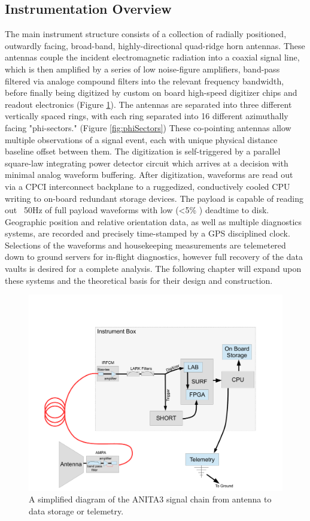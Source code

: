 	
	\subsection{Instrumentation Overview}
	The main instrument structure consists of a collection of radially positioned, outwardly facing, broad-band, highly-directional quad-ridge horn antennas.  These antennas couple the incident electromagnetic radiation into a coaxial signal line, which is then amplified by a series of low noise-figure amplifiers, band-pass filtered via analoge compound filters into the relevant frequency bandwidth, before finally being digitized by custom on board high-speed digitizer chips and readout electronics (Figure \ref{fig:RFChainBlockDiagram}).  The antennas are separated into three different vertically spaced rings, with each ring separated into 16 different azimuthally facing "phi-sectors." (Figure \ref{fig:phiSectors})  These co-pointing antennas allow multiple observations of a signal event, each with unique physical distance baseline offset between them.   The digitization is self-triggered by a parallel square-law integrating power detector circuit which arrives at a decision with minimal analog waveform buffering.  After digitization, waveforms are read out via a CPCI interconnect backplane to a ruggedized, conductively cooled CPU writing to on-board redundant storage devices.  The payload is capable of reading out ~50Hz of full payload waveforms with low (\textless 5\% ) deadtime to disk.  Geographic position and relative orientation data, as well as multiple diagnostics systems, are recorded and precisely time-stamped by a GPS disciplined clock.  Selections of the waveforms and housekeeping measurements are telemetered down to ground servers for in-flight diagnostics, however full recovery of the data vaults is desired for a complete analysis.  The following chapter will expand upon these systems and the theoretical basis for their design and construction.
	
	
\begin{figure}
\centering
	\includegraphics[width=\textwidth]{figures/RFChainBlockDiagram}
	\caption{A simplified diagram of the ANITA3 signal chain from antenna to data storage or telemetry.}
	\label{fig:RFChainBlockDiagram}
\end{figure}

